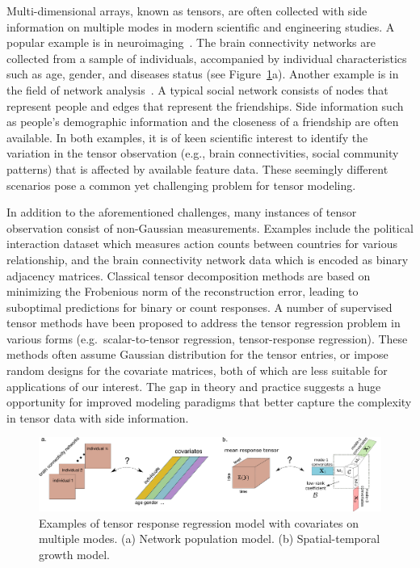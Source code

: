 \documentclass[12pt]{article}
\theoremstyle{plain}
\theoremstyle{definition}
\begin{document}
Multi-dimensional arrays, known as tensors, are often collected with side information on multiple modes in modern scientific and engineering studies. A popular example is in neuroimaging~\citep{sun2017store,zhou2013tensor}. The brain connectivity networks are collected from a sample of individuals, accompanied by individual characteristics such as age, gender, and diseases status (see Figure~\ref{fig:intro1}a). Another example is in the field of network analysis~\citep{baldin2018optimal,hoff2005bilinear}. A typical social network consists of nodes that represent people and edges that represent the friendships. Side information such as people’s demographic information and the closeness of a friendship are often available. In both examples, it is of keen scientific interest to identify the variation in the tensor observation (e.g., brain connectivities, social community patterns) that is affected by available feature data. These seemingly different scenarios pose a common yet challenging problem for tensor modeling. 

In addition to the aforementioned challenges, many instances of tensor observation consist of non-Gaussian measurements. Examples include the political interaction dataset \citep{hu2015scalable} which measures action counts between countries for various relationship, and the brain connectivity network data \citep{wang2019common} which is encoded as binary adjacency matrices. Classical tensor decomposition methods are based on minimizing the Frobenious norm of the reconstruction error, leading to suboptimal predictions for binary or count responses. A number of supervised tensor methods have been proposed \citep{yu2016learning, raskutti2015convex, zhao2012higher} to address the tensor regression problem in various forms (e.g.\ scalar-to-tensor regression, tensor-response regression). These methods often assume Gaussian distribution for the tensor entries, or impose random designs for the covariate matrices, both of which are less suitable for applications of our interest. The gap in theory and practice suggests a huge opportunity for improved modeling paradigms that better capture the complexity in tensor data with side information.

\begin{figure}[t]
\begin{center}
\includegraphics[width=16cm]{new_introfigure1.pdf}
\end{center}
\caption{Examples of tensor response regression model with covariates on multiple modes. (a) Network population model. (b) Spatial-temporal growth model. }\label{fig:intro1}
\end{figure}
\end{document}
